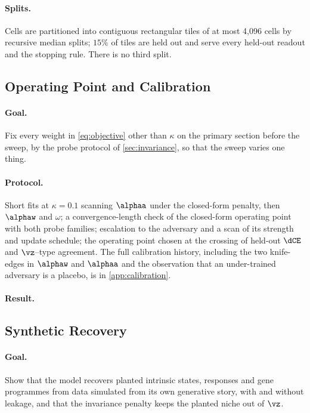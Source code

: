 \paragraph{Splits.}
Cells are partitioned into contiguous rectangular tiles of at most 4{,}096 cells by recursive median splits; $15\%$ of tiles are held out and serve every held-out readout and the stopping rule. There is no third split. 

\subsection{Operating Point and Calibration}
\label{sec:operating-point}

\paragraph{Goal.} Fix every weight in \cref{eq:objective} other than $\kappa$ on the primary section before the sweep, by the probe protocol of \cref{sec:invariance}, so that the sweep varies one thing.

\paragraph{Protocol.} Short fits at $\kappa = 0.1$ scanning $\alphaa$ under the closed-form penalty, then $\alphaw$ and $\omega$; a convergence-length check of the closed-form operating point with both probe families; escalation to the adversary and a scan of its strength and update schedule; the operating point chosen at the crossing of held-out $\dCE$ and $\vz$--type agreement. The full calibration history, including the two knife-edges in $\alphaw$ and $\alphaa$ and the observation that an under-trained adversary is a placebo, is in \cref{app:calibration}.

\paragraph{Result.} 

\subsection{Synthetic Recovery}
\label{sec:synthetic}

\paragraph{Goal.} Show that the model recovers planted intrinsic states, responses and gene programmes from data simulated from its own generative story, with and without leakage, and that the invariance penalty keeps the planted niche out of $\vz$.

